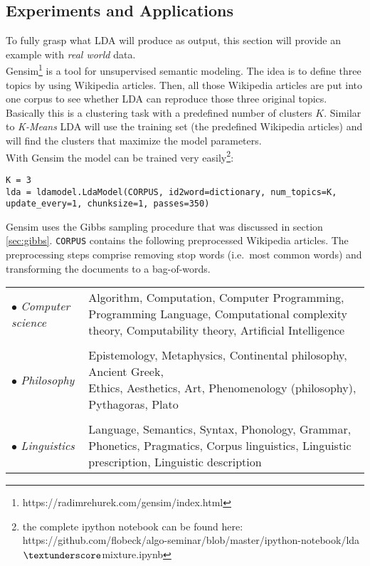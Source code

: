 \documentclass[a4paper,ngerman, english]{atseminar}
\begin{document}
\subsection{Experiments and Applications}
To fully grasp what LDA will produce as output, this section will provide an example with 
\textit{real world} data. \\
Gensim\footnote{ https://radimrehurek.com/gensim/index.html } is a tool for unsupervised semantic modeling.
The idea is to define three topics by using Wikipedia articles. Then, all those Wikipedia articles are
put into one corpus to see whether LDA can reproduce those three original topics. 
Basically this is a clustering task with a predefined number of clusters $K$. Similar to \textit{K-Means} LDA will 
use the training set (the predefined Wikipedia articles) and will find the clusters that maximize the model parameters.  
\\
With Gensim the model can be trained very easily\footnote{the complete ipython notebook can be found here: https://github.com/flobeck/algo-seminar/blob/master/ipython-notebook/lda$\textunderscore$mixture.ipynb}: \\
\begin{lstlisting}[label=noam,caption=\; Training the LDA model]
K = 3
lda = ldamodel.LdaModel(CORPUS, id2word=dictionary, num_topics=K, 
update_every=1, chunksize=1, passes=350)
\end{lstlisting}
Gensim uses the Gibbs sampling procedure that was discussed in section \ref{sec:gibbs}.
\texttt{CORPUS} contains the following preprocessed Wikipedia articles. The preprocessing steps comprise removing stop words (i.e.~most common words) and transforming the documents to a bag-of-words.
\vspace{1.3cm}

\begin{tabular}{l l}
$\bullet$ \textit{Computer science} & \parbox[t]{10cm}{Algorithm, Computation, Computer Programming,  Programming Language, Computational complexity theory, Computability theory, Artificial Intelligence}\\  
\\
$\bullet$ \textit{Philosophy} & \parbox[t]{10cm}{Epistemology, Metaphysics, Continental philosophy, Ancient Greek,\\ Ethics, Aesthetics, Art, Phenomenology (philosophy), Pythagoras, Plato} \\
\\
$\bullet$ \textit{Linguistics} &  \parbox[t]{10cm}{Language, Semantics, Syntax, Phonology, Grammar,
               Phonetics, Pragmatics,  Corpus linguistics, Linguistic prescription, Linguistic description}
\end{tabular}
\end{document}

